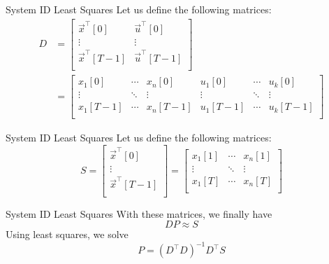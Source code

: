 \begin{frame}{System ID Least Squares}
	Let us define the following matrices:
	\begin{align*}
		D
		& =
		\begin{bmatrix}
			\vec{x}^\top [0] & \vec{u}^\top [0] \\
			\vdots & \vdots \\
			\vec{x}^\top[T-1] & \vec{u}^\top [T-1] \\
		\end{bmatrix}
		\\ & =
		\begin{bmatrix}
			x_1[0] & \cdots & x_n[0] & u_1[0] & \cdots & u_k[0] \\
			\vdots & \ddots & \vdots & \vdots & \ddots & \vdots \\
			x_1[T-1] & \cdots & x_n[T-1] & u_1[T-1] & \cdots & u_k[T-1] \\
		\end{bmatrix}
	\end{align*}
\end{frame}

\begin{frame}{System ID Least Squares}
	Let us define the following matrices:
	\[
		S
		=
		\begin{bmatrix}
			\vec{x}^\top [0] \\
			\vdots \\
			\vec{x}^\top [T-1] \\
		\end{bmatrix}
		=
		\begin{bmatrix}
			x_1[1] & \cdots & x_n[1] \\
			\vdots & \ddots & \vdots \\
			x_1[T] & \cdots & x_n[T] \\
		\end{bmatrix}
	\]
\end{frame}

\begin{frame} {System ID Least Squares}
	With these matrices, we finally have
	\[
	DP \approx S
	\]
	Using least squares, we solve
	\[
	P = \left( D^\top D \right) ^ {-1} D^\top S
	\]
\end{frame}